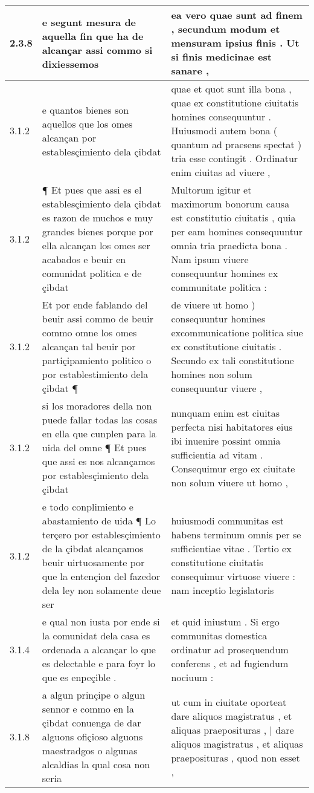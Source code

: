 \begin{tabular}{|p{1cm}|p{6.5cm}|p{6.5cm}|}
2.3.8 & e segunt mesura de aquella fin que ha de alcançar assi commo si dixiessemos & ea vero quae sunt ad finem , secundum modum et mensuram ipsius finis . Ut si finis medicinae est sanare , \\\hline
3.1.2 & e quantos bienes son aquellos que los omes alcançan por establesçimiento dela çibdat & quae et quot sunt illa bona , quae ex constitutione ciuitatis homines consequuntur . Huiusmodi autem bona ( quantum ad praesens spectat ) tria esse contingit . Ordinatur enim ciuitas ad viuere , \\\hline
3.1.2 & ¶ Et pues que assi es el establesçimiento dela çibdat es razon de muchos e muy grandes bienes porque por ella alcançan los omes ser acabados e beuir en comunidat politica e de çibdat & Multorum igitur et maximorum bonorum causa est constitutio ciuitatis , quia per eam homines consequuntur omnia tria praedicta bona . Nam ipsum viuere consequuntur homines ex communitate politica : \\\hline
3.1.2 & Et por ende fablando del beuir assi commo de beuir commo omne los omes alcançan tal beuir por partiçipamiento politico o por establestimiento dela çibdat ¶ & de viuere ut homo ) consequuntur homines excommunicatione politica siue ex constitutione ciuitatis . Secundo ex tali constitutione homines non solum consequuntur viuere , \\\hline
3.1.2 & si los moradores della non puede fallar todas las cosas en ella que cunplen para la uida del omne ¶ Et pues que assi es nos alcançamos por establesçimiento dela çibdat & nunquam enim est ciuitas perfecta nisi habitatores eius ibi inuenire possint omnia sufficientia ad vitam . Consequimur ergo ex ciuitate non solum viuere ut homo , \\\hline
3.1.2 & e todo conplimiento e abastamiento de uida ¶ Lo terçero por establesçimiento de la çibdat alcançamos beuir uirtuosamente por que la entençion del fazedor dela ley non solamente deue ser & huiusmodi communitas est habens terminum omnis per se sufficientiae vitae . Tertio ex constitutione ciuitatis consequimur virtuose viuere : nam inceptio legislatoris \\\hline
3.1.4 & e qual non iusta por ende si la comunidat dela casa es ordenada a alcançar lo que es delectable e para foyr lo que es enpeçible . & et quid iniustum . Si ergo communitas domestica ordinatur ad prosequendum conferens , et ad fugiendum nociuum : \\\hline
3.1.8 & a algun prinçipe o algun sennor e commo en la çibdat conuenga de dar alguons ofiçioso alguons maestradgos o algunas alcaldias la qual cosa non seria & ut cum in ciuitate oporteat dare aliquos magistratus , et aliquas praeposituras , | dare aliquos magistratus , et aliquas praeposituras , quod non esset , \\\hline

\end{tabular}
